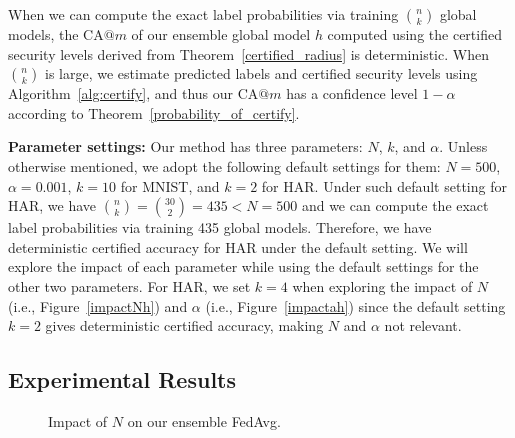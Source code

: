 \documentclass[letterpaper]{article} %
\begin{document}
When we can compute the exact label probabilities via training ${n \choose k}$ global models, the CA$@m$ of our ensemble global model $h$ computed using the certified security levels derived from Theorem~\ref{certified_radius} is deterministic. When ${n \choose k}$ is large, we estimate predicted labels and certified security levels using Algorithm~\ref{alg:certify}, and thus our CA$@m$ has a confidence level $1-\alpha$ according to Theorem~\ref{probability_of_certify}.

\noindent
{\bf Parameter settings:}  Our method has three parameters: $N$, $k$, and $\alpha$. Unless otherwise mentioned, we adopt the following default settings for them: $N=500$, $\alpha=0.001$,  $k=10$ for MNIST, and $k=2$ for HAR.
Under such default setting for HAR, we have ${n \choose k}={30 \choose 2} = 435 < N=500$ and  we can compute the exact label probabilities via training 435 global models. Therefore, we have deterministic certified accuracy for HAR under the default setting. We will explore the impact of each parameter while using the default settings for the other two parameters. For HAR, we set $k=4$ when exploring the impact of $N$ (i.e., Figure~\ref{impactNh}) and $\alpha$ (i.e., Figure~\ref{impactah}) since the default setting $k=2$ gives deterministic certified accuracy, making $N$ and $\alpha$ not relevant.

\subsection{Experimental Results}

\begin{figure}[!t]
\center
{}
\caption{Impact of $N$ on our ensemble FedAvg.}
\label{fig:N}
\end{figure}
\end{document}
